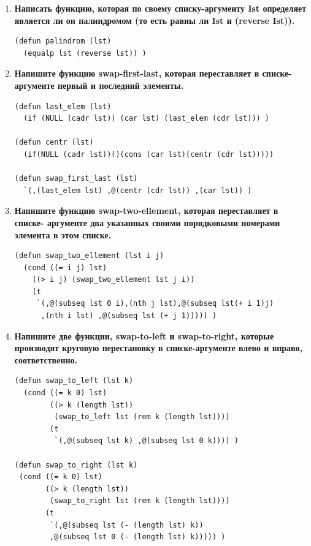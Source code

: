 \documentclass[a4paper,14pt]{extreport} %
\begin{document}
\begin{enumerate}
\item \textbf{Написать функцию, которая по своему списку-аргументу Ist определяет является ли он палиндромом (то есть равны ли Ist и (reverse Ist)).}

\begin{lstlisting}
(defun palindrom (lst)
  (equalp lst (reverse lst)) )
\end{lstlisting}

\item \textbf{Напишите функцию swap-first-last, которая переставляет в списке-аргументе первый и последний элементы.}

\begin{lstlisting}
(defun last_elem (lst)
  (if (NULL (cadr lst)) (car lst) (last_elem (cdr lst))) )

(defun centr (lst)
  (if(NULL (cadr lst))()(cons (car lst)(centr (cdr lst)))))

(defun swap_first_last (lst)
  `(,(last_elem lst) ,@(centr (cdr lst)) ,(car lst)) )
\end{lstlisting}

\item \textbf{Напишите функцию swap-two-ellement, которая переставляет в списке- аргументе два указанных своими порядковыми номерами элемента в этом списке.}

\begin{lstlisting}
(defun swap_two_ellement (lst i j)
  (cond ((= i j) lst)
    ((> i j) (swap_two_ellement lst j i))
    (t
     `(,@(subseq lst 0 i),(nth j lst),@(subseq lst(+ i 1)j)
      ,(nth i lst) ,@(subseq lst (+ j 1))))) )
\end{lstlisting}

\item \textbf{Напишите две функции, swap-to-left и swap-to-right, которые производят круговую перестановку в списке-аргументе влево и вправо, соответственно.}

\begin{lstlisting}
(defun swap_to_left (lst k)
  (cond ((= k 0) lst)
        ((> k (length lst)) 
         (swap_to_left lst (rem k (length lst))))
        (t
         `(,@(subseq lst k) ,@(subseq lst 0 k)))) )

(defun swap_to_right (lst k)
 (cond ((= k 0) lst)
       ((> k (length lst)) 
        (swap_to_right lst (rem k (length lst))))
       (t
        `(,@(subseq lst (- (length lst) k)) 
        ,@(subseq lst 0 (- (length lst) k))))) )
\end{lstlisting}


\end{enumerate}
\end{document}

